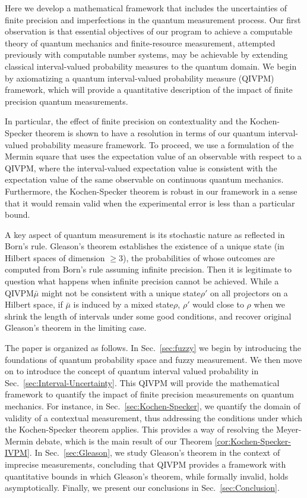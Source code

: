 \documentclass[english,reprint, aps, prl,superscriptaddress, showpacs,
showkeys, longbibliography, amsmath, amssymb]{revtex4-1}
\theoremstyle{plain}
\theoremstyle{definition}
\newcommand{\nb}{\nolinebreak[1] }
\begin{document}
Here we develop a mathematical framework that includes the uncertainties of finite precision and imperfections in the quantum measurement process.  Our first observation is that essential objectives of our program to
achieve a computable theory of quantum mechanics and finite-resource
measurement, attempted previously with computable number
systems\nb\cite{usat,geometry2013apsrev4,DQT2014}, may be achievable by
extending classical interval-valued probability
measures\nb\cite{JamisonLodwick2004} to the quantum domain.  We begin by axiomatizing a quantum interval-valued probability measure (QIVPM) framework, which will provide a quantitative description of the impact of finite precision quantum measurements.

In particular, the effect of finite precision on contextuality and the
Kochen-Specker theorem is shown to have a resolution in terms of our quantum interval-valued probability measure framework.  To proceed, we use a formulation of the Mermin square that uses the
expectation value of an observable with respect
to a QIVPM, where the interval-valued
expectation value is consistent with the expectation value of the
same observable on continuous quantum mechanics. Furthermore, the
Kochen-Specker theorem is robust in our framework in a sense that
it would remain valid when the experimental error is less than a particular
bound.

A key aspect of quantum measurement is its stochastic nature as reflected
in Born's rule\nb\citep{Born1983,peres1995quantum,544199}. Gleason's
theorem establishes the existence of a unique state (in Hilbert spaces
of dimension $\ge3$), the probabilities of whose outcomes are computed
from Born's rule assuming infinite precision\nb\citep{gleason1957,Redhead1987-REDINA,peres1995quantum}.
Then it is legitimate to question what happens when infinite precision
cannot be achieved. While a QIVPM\nb$\bar{\mu}$ might not be consistent
with a unique state\nb$\rho'$ on all projectors on a Hilbert space,
if $\bar{\mu}$ is induced by a mixed state\nb$\rho$, $\rho'$ would
close to $\rho$ when we shrink the length of intervals under some
good conditions, and recover original Gleason's theorem in the limiting
case.

The paper is organized as follows.   In Sec.\ \ref{sec:fuzzy} we begin by introducing the foundations of quantum probability space and fuzzy measurement.  We then move on to introduce the concept of quantum interval valued probability in Sec.\ \ref{sec:Interval-Uncertainty}.  This QIVPM will provide the mathematical framework to quantify the impact of finite precision measurements on quantum mechanics.  For instance, in Sec.\ \ref{sec:Kochen-Specker},  we quantify the domain of validity of a  contextual measurement, thus addressing the conditions under which the Kochen-Specker theorem applies.  This provides a way of resolving the Meyer-Mermin debate, which is the main result of our Theorem \ref{cor:Kochen-Specker-IVPM}.  In Sec.\ \ref{sec:Gleason}, we study Gleason's theorem in the context of imprecise measurements, concluding that QIVPM provides a framework with quantitative bounds in which Gleason's theorem, while formally invalid, holds asymptotically.  Finally, we present our conclusions in Sec.~\ref{sec:Conclusion}.
\end{document}
